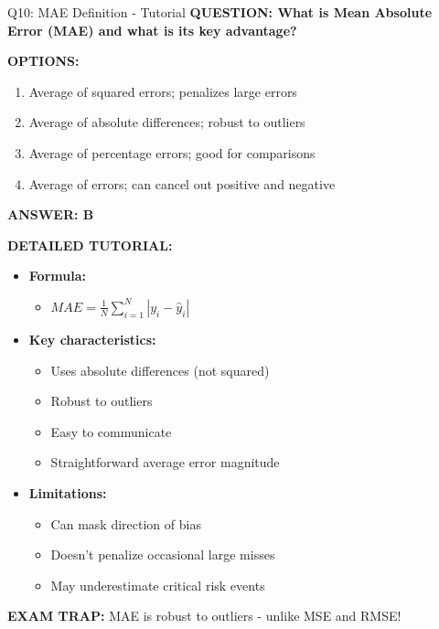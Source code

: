 \documentclass[8pt]{beamer}
\begin{document}
	\begin{frame}{Q10: MAE Definition - Tutorial}
		\fontsize{6.5}{7.5}\selectfont
		\textbf{QUESTION: What is Mean Absolute Error (MAE) and what is its key advantage?}
		
		\vspace{0.1cm}
		\textbf{OPTIONS:}
		\begin{enumerate}
			\item Average of squared errors; penalizes large errors
			\item Average of absolute differences; robust to outliers
			\item Average of percentage errors; good for comparisons
			\item Average of errors; can cancel out positive and negative
		\end{enumerate}
		
		\vspace{0.1cm}
		\textcolor{myblue}{\textbf{ANSWER: B}}
		
		\vspace{0.1cm}
		\textbf{DETAILED TUTORIAL:}
		\begin{itemize}
			\item \textbf{Formula:}
			\begin{itemize}
				\item $MAE = \frac{1}{N}\sum_{i=1}^N |y_i - \hat{y}_i|$
			\end{itemize}
			\item \textbf{Key characteristics:}
			\begin{itemize}
				\item Uses absolute differences (not squared)
				\item Robust to outliers
				\item Easy to communicate
				\item Straightforward average error magnitude
			\end{itemize}
			\item \textbf{Limitations:}
			\begin{itemize}
				\item Can mask direction of bias
				\item Doesn't penalize occasional large misses
				\item May underestimate critical risk events
			\end{itemize}
		\end{itemize}
		
		\textcolor{myred}{\textbf{EXAM TRAP:}} MAE is \textcolor{myblue}{robust to outliers} - unlike MSE and RMSE!
	\end{frame}
	
\end{document}
